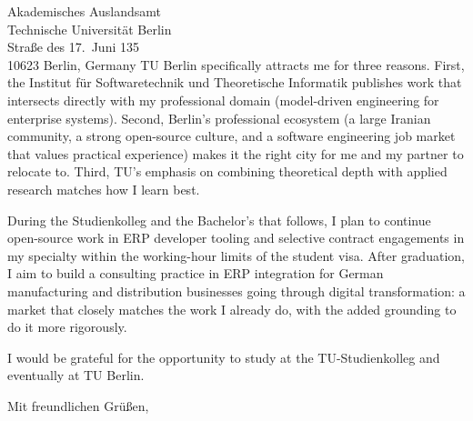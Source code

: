 \begin{letter}{
  Akademisches Auslandsamt\\
  Technische Universität Berlin\\
  Straße des 17.\ Juni 135\\
  10623 Berlin, Germany
}
TU Berlin specifically attracts me for three reasons. First, the Institut für Softwaretechnik und Theoretische Informatik publishes work that intersects directly with my professional domain (model-driven engineering for enterprise systems). Second, Berlin's professional ecosystem (a large Iranian community, a strong open-source culture, and a software engineering job market that values practical experience) makes it the right city for me and my partner to relocate to. Third, TU's emphasis on combining theoretical depth with applied research matches how I learn best.

During the Studienkolleg and the Bachelor's that follows, I plan to continue open-source work in ERP developer tooling and selective contract engagements in my specialty within the working-hour limits of the student visa. After graduation, I aim to build a consulting practice in ERP integration for German manufacturing and distribution businesses going through digital transformation: a market that closely matches the work I already do, with the added grounding to do it more rigorously.

I would be grateful for the opportunity to study at the TU-Studienkolleg and eventually at TU Berlin.

\closing{Mit freundlichen Grüßen,}

\end{letter}


